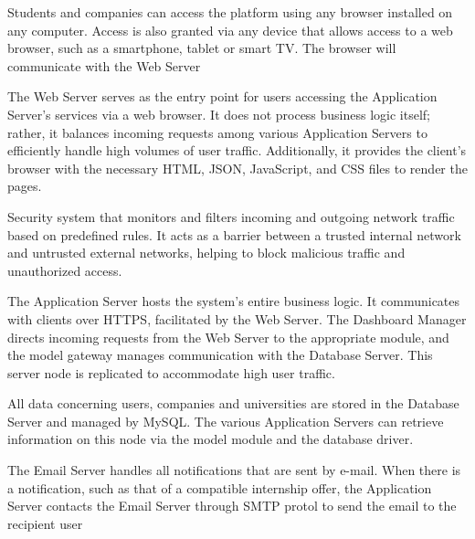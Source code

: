 \begin{description}[noitemsep,    %
                    itemsep=1em, %
                    labelsep=0.5em] %
                    \item[\textbf{Personal computer:}] Students and companies can access the platform using any browser installed on any computer. Access is also granted via any device that allows access to a web browser, such as a smartphone, tablet or smart TV. The browser will communicate with the Web Server
  \item[\textbf{Web Server:}] The Web Server serves as the entry point for users accessing the Application Server’s services via a web browser. It does not process business logic itself; rather, it balances incoming requests among various Application Servers to efficiently handle high volumes of user traffic. Additionally, it provides the client’s browser with the necessary HTML, JSON, JavaScript, and CSS files to render the pages.
  \item[\textbf{Firewall:}] Security system that monitors and filters incoming and outgoing network traffic based on predefined rules. It acts as a barrier between a trusted internal network and untrusted external networks, helping to block malicious traffic and unauthorized access.
  \item[\textbf{Application Server:}] The Application Server hosts the system’s entire business logic. It communicates with clients over HTTPS, facilitated by the Web Server. The Dashboard Manager directs incoming requests from the Web Server to the appropriate module, and the model gateway manages communication with the Database Server. This server node is replicated to accommodate high user traffic.
  \item[\textbf{Database Server:}] All data concerning users, companies and universities are stored in the Database Server and managed by MySQL.
The various Application Servers can retrieve information on this node via the model module and the database driver.
  \item[\textbf{Email Server:}] The Email Server handles all notifications that are sent by e-mail. When there is a notification, such as that of a compatible internship offer, the Application Server contacts the Email Server through SMTP protol to send the email to the recipient user
\end{description}


